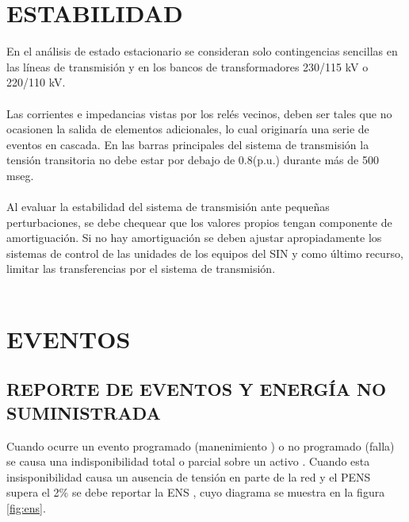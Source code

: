 \documentclass[a5paper]{book}%
\begin{document}
\chapter{ESTABILIDAD}
 En el análisis de estado estacionario se consideran solo
  contingencias sencillas en las líneas de transmisión y en los bancos
  de transformadores 230/115 kV o 220/110 kV.\\\\
	
	
 Las corrientes e impedancias vistas por los relés vecinos, deben
  ser tales que no ocasionen la salida de elementos adicionales, lo
  cual originaría una serie de eventos en cascada.  En las barras
  principales del sistema de transmisión la tensión transitoria no
  debe estar por debajo de 0.8(p.u.) durante más de 500 mseg.\\\\
	
 Al evaluar la estabilidad del sistema de transmisión ante
  pequeñas perturbaciones, se debe chequear que los valores propios
  tengan componente de amortiguación. Si no hay amortiguación se deben
  ajustar apropiadamente los sistemas de control de las unidades de
  los equipos del SIN y como último recurso, limitar las
  transferencias por el sistema de transmisión.\\\\


                          \chapter{EVENTOS}

\section{REPORTE DE EVENTOS Y ENERGÍA NO SUMINISTRADA}

Cuando ocurre un evento programado (manenimiento ) o no programado (falla) se causa una
indisponibilidad total o parcial  sobre un activo \cite{CREG0942012}. Cuando esta
insisponibilidad causa un ausencia de tensión  en parte de la red y el \ac{PENS} supera el 2\%  se debe reportar la \ac{ENS} \cite{CREG0152018}, cuyo diagrama se muestra en la figura \ref{fig:ens}.
\end{document}

